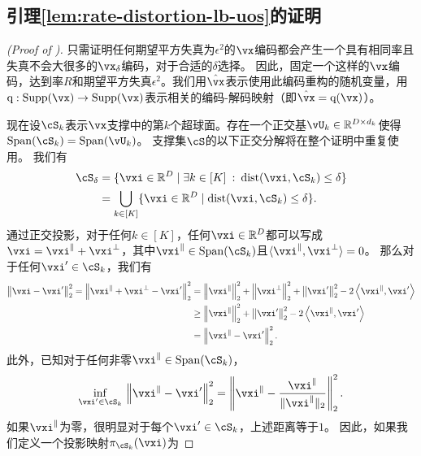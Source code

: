 \documentclass[../../book-main.tex]{subfiles}
\begin{document}
\subsection{引理\ref{lem:rate-distortion-lb-uos}的证明}\label{sec:app-rate-dist-deferred-proofs}

\begin{proof}[(Proof of )]
    只需证明任何期望平方失真为$\epsilon^2$的$\vx$编码都会产生一个具有相同率且失真不会大很多的$\vx_{\delta}$编码，对于合适的$\delta$选择。
    因此，固定一个这样的$\vx$编码，达到率$R$和期望平方失真$\epsilon^2$。我们用$\hat{\vx}$表示使用此编码重构的随机变量，用$\mathrm{q} : \Supp(\vx) \to \Supp(\vx)$表示相关的编码-解码映射（即$\hat{\vx} = \mathrm{q}(\vx)$）。

    现在设$\cS_k$表示$\vx$支撑中的第$k$个超球面。存在一个正交基$\vU_{k} \in \R^{D \times d_k}$使得$\Span(\cS_k) = \Span(\vU_k)$。
    支撑集$\cS$的以下正交分解将在整个证明中重复使用。
    我们有
    \begin{align}
        \cS_{\delta} 
        &= \set{\vxi \in \R^D \given \exists k \in [K] \::\: \dist(\vxi,
        \cS_k) \leq \delta}
        \\
        &= \bigcup_{k \in [K]} \set{\vxi \in \R^D \given \dist(\vxi,
        \cS_k) \leq \delta}.
    \end{align}
    通过正交投影，对于任何$k \in [K]$，任何$\vxi \in \R^D$都可以写成$\vxi = \vxi^{\|} + \vxi^{\perp}$，其中$\vxi^{\|} \in \Span(\cS_k)$且$\ip{\vxi^{\|}}{\vxi^\perp} = 0$。
    那么对于任何$\vxi' \in \cS_k$，我们有
    \begin{align}
        \norm*{\vxi - \vxi'}_2^2 
        = 
        \norm*{\vxi^{\|} + \vxi^{\perp} - \vxi'}_2^2
        &=
        \norm*{\vxi^{\|}}_2^2 + \norm*{\vxi^{\perp}}_2^2 + \norm*{\vxi'}_2^2
        - 2 \ip*{\vxi^{\|}}{\vxi'}
        \\
        &\geq
        \norm*{\vxi^{\|}}_2^2 + \norm*{\vxi'}_2^2
        - 2 \ip*{\vxi^{\|}}{\vxi'}
        \\
        &=
        \norm*{\vxi^{\|} - \vxi'}_2^2.
    \end{align}
    此外，已知对于任何非零$\vxi^{\|} \in \Span(\cS_k)$，
    \begin{equation}
        \inf_{\vxi' \in \cS_k}\,
        \norm*{\vxi^{\|} - \vxi'}_2^2
        =
        \norm*{\vxi^{\|} - \frac{\vxi^{\|}}{\norm{\vxi^{\|}}_2}}_2^2.
    \end{equation}
    如果$\vxi^{\|}$为零，很明显对于每个$\vxi' \in \cS_k$，上述距离等于$1$。
    因此，如果我们定义一个投影映射$\pi_{\cS_k}(\vxi)$为

\end{proof}
\end{document}

